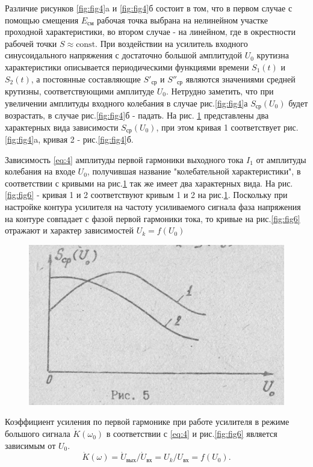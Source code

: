 Различие рисунков \ref{fig:fig4}a и \ref{fig:fig4}б состоит в том, что в первом случае с помощью смещения $E_\text{см}$ рабочая точка выбрана на нелинейном участке проходной характеристики, во втором случае - на линейном, где в окрестности рабочей точки $S\approx\text{const}$. При воздействии на усилитель входного синусоидального напряжения с достаточно большой амплитудой $U_0$ крутизна характеристики описывается периодическими функциями времени $S_1(t)$ и $S_2(t)$, а постоянные составляющие $S'_\text{ср}$ и $S''_\text{ср}$ являются значениями средней крутизны, соответствующими амплитуде $U_0$. Нетрудно заметить, что при увеличении амплитуды входного колебания в случае рис.\ref{fig:fig4}а $S_\text{ср}(U_0)$ будет возрастать, в случае рис.\ref{fig:fig4}б - падать. На рис. \ref{fig:fig5} представлены два характерных вида зависимости $S_\text{ср}(U_0)$, при этом кривая 1 соответствует рис.\ref{fig:fig4}a, кривая 2 - рис.\ref{fig:fig4}б.

Зависимость \eqref{eq:4} амплитуды первой гармоники выходного тока $I_1$ от амплитуды колебания на входе $U_0$, получившая название "колебательной характеристики", в соответствии с кривыми на рис.\ref{fig:fig5} так же имеет два характерных вида. На рис.\ref{fig:fig6} - кривая 1 и 2 соответствуют кривым 1 и 2 на рис.\ref{fig:fig5}. Поскольку при настройке контура усилителя на частоту усиливаемого сигнала фаза напряжения на контуре совпадает с фазой первой гармоники тока, то кривые на рис.\ref{fig:fig6} отражают и характер зависимостей $U_k=f(U_0)$

\begin{figure}[h]
	\centering
	\includegraphics[width=0.4\linewidth]{circuit/5.jpg}
	\caption{}
	\label{fig:fig5}
\end{figure}

Коэффициент усиления по первой гармонике при работе усилителя в режиме большого сигнала $\dot{K}(\omega_0)$ в соответствии с \eqref{eq:4} и рис.\ref{fig:fig6} является зависимым от $U_0$.
\begin{equation}
\dot{K}(\omega)=\dot{U}_\text{вых}/\dot{U}_\text{вх}=U_k/U_\text{вх}=f(U_0).
\label{eq:6}
\end{equation}

